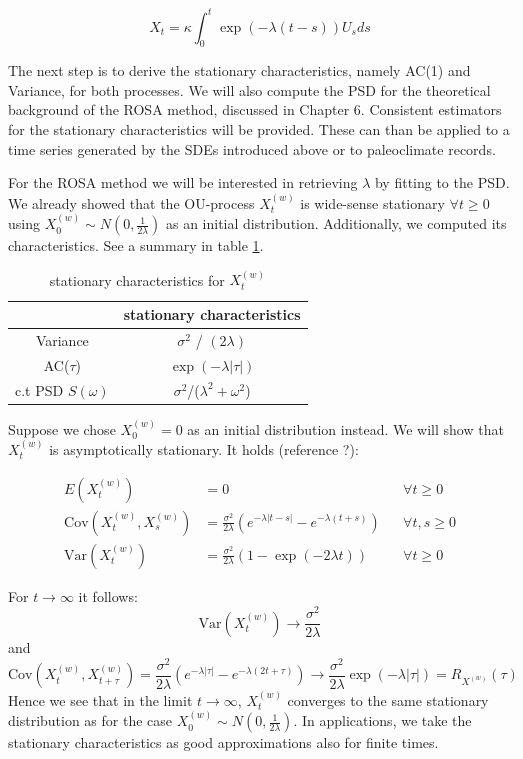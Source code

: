 \documentclass[%
thesis=student,%
coverpage=false,%
titlepage=false,%
headmarks=true, %
english,%
font=libertine, %
math=newpxtx, %
BCOR=5mm,%
coverBCOR=11mm%
]{tumbook}
\begin{document}
\begin{equation}
    X_{t} = \kappa\int_{0}^{t}\exp(-\lambda(t-s))U_{s}ds
    \label{red noise solution}
\end{equation}

The next step is to derive the stationary characteristics, namely AC(1) and Variance, for both processes. We will also compute the PSD for the theoretical background of the ROSA method, discussed in Chapter 6. Consistent estimators for the stationary characteristics will be provided. These can than be applied to a time series generated by the SDEs introduced above or to paleoclimate records. 

For the ROSA method we will be interested in retrieving $\lambda$ by fitting to the PSD. We already showed that the OU-process $X_{t}^{(w)}$ is wide-sense stationary $\forall t \geq 0$ using $X_{0}^{(w)} \sim N(0,\frac{1}{2\lambda})$ as an initial distribution. Additionally, we computed its characteristics. See a summary in table \ref{tab:white_noise_stat_char}. 


\begin{table}[t]
\centering
\begin{tabular}{|c|c|}
\hline
& stationary characteristics\\
\hline
Variance & $\sigma^2$ / $(2\lambda)$\\
AC($\tau$) & $\exp(-\lambda |\tau|)$\\
c.t PSD $S(\omega)$ & $\sigma^2$/($\lambda^2 + \omega^2$)\\
\hline
\end{tabular}
\caption{stationary characteristics for $X_{t}^{(w)}$}
\label{tab:white_noise_stat_char}
\end{table}

Suppose we chose $X_{0}^{(w)} = 0$ as an initial distribution instead. We will show that $X_{t}^{(w)}$ is asymptotically stationary. It holds (reference  ?):

 \begin{align*}
    E(X_{t}^{(w)}) &= 0   && \forall t \geq 0 \\
    \text{Cov}(X_{t}^{(w)},X_{s}^{(w)}) &= \frac{\sigma ^2}{2\lambda}(e^{-\lambda\lvert t-s \rvert}-e^{-\lambda(t+s)}) && \forall t, s \geq 0 \\
    \text{Var}(X_{t}^{(w)}) &= \frac{\sigma^2}{2\lambda}(1-\exp(-2\lambda t)) && \forall t \geq 0 
\end{align*}

For $t\rightarrow \infty$ it follows: 
\[
\text{Var}(X_{t}^{(w)})\rightarrow\frac{\sigma^2}{2\lambda}
\]
and 
\[
\text{Cov}(X_{t}^{(w)},X_{t+\tau}^{(w)}) = \frac{\sigma^2}{2\lambda}(e^{-\lambda\lvert \tau \rvert} - e^{-\lambda(2t + \tau)}) \rightarrow \frac{\sigma ^2}{2\lambda}\exp(-\lambda\lvert \tau \rvert) = R_{X^{(w)}}(\tau)
\]
Hence we see that in the limit $t\rightarrow \infty$, $X_{t}^{(w)}$ converges to the same stationary distribution as for the case $X_{0}^{(w)} \sim N(0,\frac{1}{2\lambda})$. 
In applications, we take the stationary characteristics as good approximations also for finite times.
\end{document}
